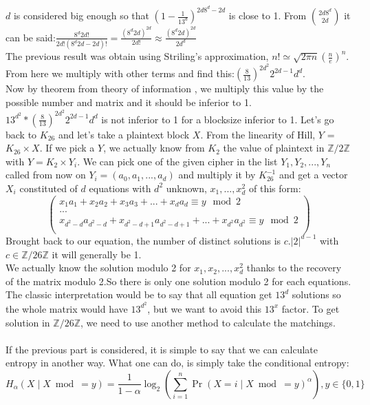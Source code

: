 \documentclass{article}
\begin{document}
$d$ is considered big enough so that $(1-\frac{1}{13^d})^{2d8^d - 2d}$ is close to 1.
From ${2d8^d \choose 2d}$ it can be said:$\frac{8^d 2d!}{2d!(8^d 2d-2d)!} = \frac{(8^d 2d)^{2d}}{2d!} \approx \frac{(8^d 2d)^{2d}}{2d^{d}}$\\
The previous result was obtain using Striling's approximation, $n! \simeq \sqrt{2\pi n}(\frac{n}{e})^n$.\\
From here we multiply with other terms and find this:$(\frac{8}{13})^{2d^2} 2^{2d-1} d^d$.\\
Now by theorem from theory of information , we multiply this value by the possible number and matrix and it should be inferior to 1.\\
$13^{d^2} * (\frac{8}{13})^{2d^2} 2^{2d-1} d^d$ is not inferior to 1 for a blocksize inferior to 1.
Let's go back to $K_{26}$ and let's take a plaintext block $X$. From the linearity of Hill, $Y$ = $K_{26} \times X$. If we pick a $Y$, we actually know from $K_{2}$ the value of plaintext in $\mathbb{Z}/2\mathbb{Z}$ with $Y = K_2 \times Y_i$. We can pick one of the given cipher in the list $ Y_1 , Y_2 , ... , Y_n$ called from now on $Y_i= (a_0,a_1,...,a_d)$  and multiply it by $K_{26}^{-1}$ and get a vector $X_i$ constituted of $d$ equations with $d^2$ unknown, $x_1, ...,x_d^{2}$ of this form:\\
$$
\begin{pmatrix}
x_1 a_1 + x_2 a_2 + x_3 a_3 + ... + x_{d} a_{d} \equiv y \mod 2 \\
...\\
x_{d^2 - d} a_{d^2 - d} + x_{d^2 - d +1}  a_{d^2 - d+1}  + ... + x_{d^2} a_{d^2} \equiv y \mod 2\\
\end{pmatrix}
$$
Brought back to our equation, the number of distinct solutions is $c.|2|^{d-1}$ with $c \in  \mathbb{Z}/26\mathbb{Z}$ it will generally be 1.\\
We actually know the solution modulo 2 for $x_1 ,x_2 ,... , x_d^{2}$ thanks to the recovery of the matrix modulo 2.So there is only one solution modulo 2 for each equations. The classic interpretation would be to say that all equation get $13^d$ solutions so the whole matrix would have $13^{d^2}$, but we want to avoid this $13^x$ factor. To get solution in $\mathbb{Z}/26\mathbb{Z}$, we need to use another method to calculate the matchings.\\
\\
If the previous part is considered, it is simple to say that we can calculate entropy in another way. What one can do, is simply take the conditional entropy:$$H_{\alpha}(X \mid X \bmod = y) = \frac{1}{1-\alpha}\log_{2}(\sum_{i=1}^{n}{\Pr(X=i \mid X \bmod = y )^{\alpha}}) , y \in \{0,1\} $$\\
\end{document}
